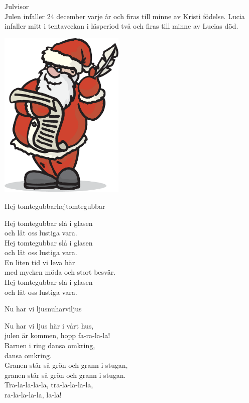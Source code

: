 \begin{flushleft}
{\Huge Julvisor\\}
{\Large
\vspace{1cm}
Julen infaller 24 december varje år och firas till minne av Kristi
födelse. Lucia infaller mitt i tentaveckan i läsperiod två och firas
till minne av Lucias död.}
\end{flushleft}
\vspace{2cm}
\begin{center}
\includegraphics[width=6cm]{bilder/112.eps}

\end{center}

\newpage

\begin{song}{Hej tomtegubbar}{hejtomtegubbar}
\begin{vers}
Hej tomtegubbar slå i glasen\\
och låt oss lustiga vara.\\
Hej tomtegubbar slå i glasen\\
och låt oss lustiga vara.\\
En liten tid vi leva här\\
med mycken möda och stort besvär.\\
Hej tomtegubbar slå i glasen\\
och låt oss lustiga vara.\\
\end{vers}
\end{song}

\begin{song}{Nu har vi ljus}{nuharviljus}
\begin{vers}
Nu har vi ljus här i vårt hus,\\
julen är kommen, hopp fa-ra-la-la!\\
Barnen i ring dansa omkring,\\
dansa omkring.\\
Granen står så grön och grann i stugan,\\
granen står så grön och grann i stugan.\\
Tra-la-la-la-la, tra-la-la-la-la,\\
ra-la-la-la-la, la-la!\\
\end{vers}
\end{song}
\newpage


